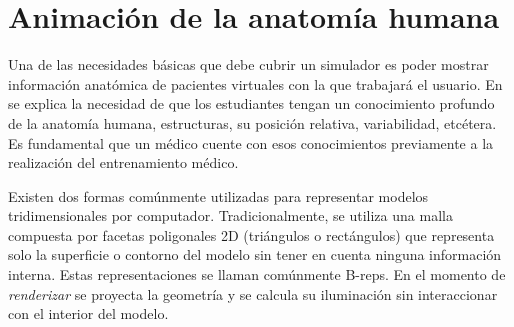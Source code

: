 \section{Animación de la anatomía humana} 
\label{art:anatomy}



Una de las necesidades básicas que debe cubrir un simulador es poder mostrar información anatómica de pacientes virtuales con la que trabajará el usuario. En  \cite{preim2018survey} se explica la necesidad de que los estudiantes tengan un conocimiento profundo de la anatomía humana, estructuras, su posición relativa, variabilidad, etcétera. Es fundamental que un médico cuente con esos conocimientos previamente a la realización del entrenamiento médico.

Existen dos formas comúnmente utilizadas para representar modelos tridimensionales por computador. Tradicionalmente, se utiliza una malla compuesta por facetas poligonales 2D (triángulos o rectángulos) que representa solo la superficie o contorno del modelo sin tener en cuenta ninguna información interna. Estas representaciones se llaman comúnmente \acp{B-rep}. En el momento de \emph{renderizar} se proyecta la geometría y se calcula su iluminación sin interaccionar con el interior del modelo.

